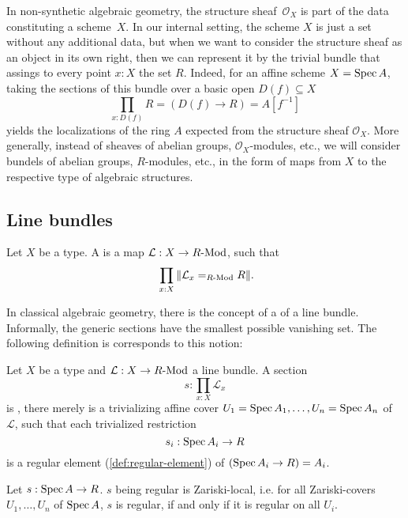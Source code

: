 In non-synthetic algebraic geometry,
the structure sheaf~$\mathcal{O}_X$ is part of the data constituting a scheme~$X$.
In our internal setting,
the scheme $X$ is just a set without any additional data,
but when we want to consider the structure sheaf as an object in its own right,
then we can represent it by the trivial bundle
that assings to every point $x : X$ the set $R$.
Indeed, for an affine scheme $X = \operatorname{Spec} A$,
taking the sections of this bundle over a basic open $D(f) \subseteq X$
\[ \prod_{x : D(f)} R = (D(f) \to R) = A[f^{-1}] \]
yields the localizations of the ring $A$
expected from the structure sheaf $\mathcal{O}_X$.
More generally,
instead of sheaves of abelian groups, $\mathcal{O}_X$-modules, etc.,
we will consider bundels of abelian groups, $R$-modules, etc.,
in the form of maps from $X$ to the respective type of algebraic structures.

\subsection{Line bundles}

\begin{definition}%
  Let $X$ be a type.
  A  is a map $\mathcal L : X\to R\text{-}\mathrm{Mod}$,
  such that
  \[ \prod_{x:X}\|\mathcal L_x=_{\Mod{R}}R\|\rlap{.}\]
\end{definition}

In classical algebraic geometry,
there is the concept of a  of a line bundle.
Informally, the generic sections have the smallest possible vanishing set.
The following definition is corresponds to this notion:

\begin{definition}%
  \label{def:regular-section}
  Let $X$ be a type and $\mathcal L:X\to R\text{-}\mathrm{Mod}$ a line bundle.
  A section
  \[ s:\prod_{x:X}\mathcal L_x \]
  is , there merely is a trivializing affine cover $U_1=\operatorname{Spec} A_1,\dots,U_n=\operatorname{Spec} A_n$
  of $\mathcal L$, such that each trivialized restriction
  \[ s_i:\operatorname{Spec} A_i\to R \]
  is a regular element (\cref{def:regular-element}) of $(\operatorname{Spec} A_i\to R) = A_i$.
\end{definition}

\begin{lemma}%
  \label{lem:regular-zariski-local}
  Let $s:\operatorname{Spec} A\to R$.
  $s$ being regular is Zariski-local, i.e.
  for all Zariski-covers $U_1,\dots,U_n$ of $\operatorname{Spec} A$,
  $s$ is regular, if and only if it is regular on all $U_i$.
\end{lemma}

